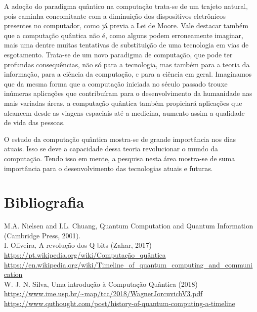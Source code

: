\documentclass[12pt, a4paper, oneside]{article}
\begin{document}
\par A adoção do paradigma quântico na
computação trata-se de um trajeto natural, pois caminha concomitante com a diminuição
dos dispositivos eletrônicos presentes no computador, como já previa a Lei de Moore. Vale
destacar também que a computação quântica não é, como alguns podem erroneamente
imaginar, mais uma dentre muitas tentativas de substituição de uma tecnologia em vias
de esgotamento. Trata-se de um novo paradigma de computação, que pode ter profundas
consequências, não só para a tecnologia, mas também para a teoria da informação, para a
ciência da computação, e para a ciência em geral. Imaginamos que da mesma forma que
a computação iniciada no século passado trouxe inúmeras aplicações que contribuíram
para o desenvolvimento da humanidade nas mais variadas áreas, a computação quântica
também propiciará aplicações que alcancem desde as viagens espaciais até a medicina,
aumento assim a qualidade de vida das pessoas.


\par O estudo da computação quântica mostra-se de grande importância nos dias atuais.
Isso se deve a capacidade dessa teoria revolucionar o mundo da computação. Tendo isso
em mente, a pesquisa nesta área mostra-se de suma importância para o desenvolvimento
das tecnologias atuais e futuras. 



\section*{Bibliografia}

\noindent [1] M.A. Nielsen and I.L. Chuang, Quantum Computation and Quantum Information (Cambridge Press, 2001).\\

\noindent [2] I. Oliveira, A revolução dos Q-bits (Zahar, 2017)\\

\noindent [3] \url{https://pt.wikipedia.org/wiki/Computação_quântica}\\

\noindent [4] \url{https://en.wikipedia.org/wiki/Timeline_of_quantum_computing_and_communication}\\

\noindent [5] W. J. N. Silva, Uma introdução à Computação Quântica (2018)\\
\url{https://www.ime.usp.br/~map/tcc/2018/WagnerJorcuvichV3.pdf}\\

\noindent [6] \url{https://www.quthought.com/post/history-of-quantum-computing-a-timeline}\\
\end{document}

